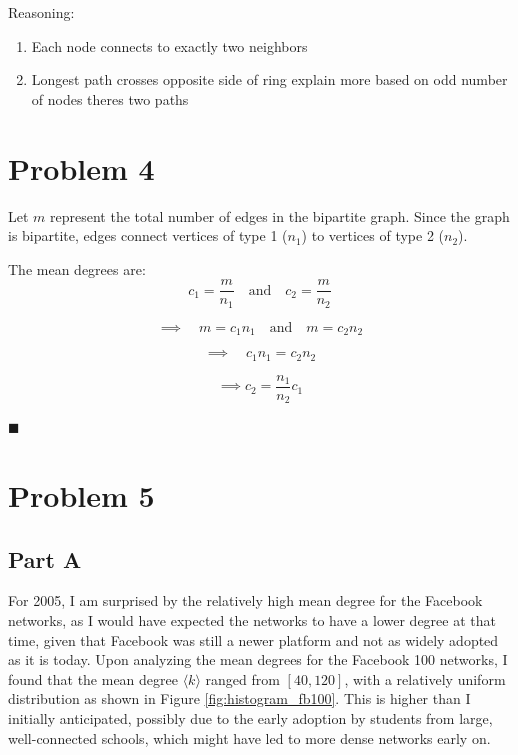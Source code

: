 \documentclass[12pt]{article}
\begin{document}
\noindent Reasoning:
\begin{enumerate}
    \item Each node connects to exactly two neighbors
    \item Longest path crosses opposite side of ring
    explain more based on odd number of nodes theres two paths
\end{enumerate}

\section*{Problem 4}

Let \(m\) represent the total number of edges in the bipartite graph. Since the graph is bipartite, edges connect vertices of type 1 (\(n_1\)) to vertices of type 2 (\(n_2\)).

\noindent The mean degrees are:
\[
c_1 = \frac{m}{n_1} \quad \text{and} \quad c_2 = \frac{m}{n_2}
\]

\[
    \implies \quad m = c_1 n_1 \quad \text{and} \quad m = c_2 n_2
\]


\[
    \implies \quad c_1 n_1 = c_2 n_2
\]

\[
    \implies c_2 = \frac{n_1}{n_2} c_1 
\]

\begin{flushright}
    \(\blacksquare\)
\end{flushright}


\section*{Problem 5}
\subsection*{Part A}

For 2005, I am surprised by the relatively high mean degree for the Facebook networks, as I would have expected the networks to have a lower degree at that time, given that Facebook was still a newer platform and not as widely adopted as it is today. Upon analyzing the mean degrees for the Facebook 100 networks, I found that the mean degree $\langle k \rangle $ ranged from $[40, 120]$, with a relatively uniform distribution as shown in Figure \ref{fig:histogram_fb100}. This is higher than I initially anticipated, possibly due to the early adoption by students from large, well-connected schools, which might have led to more dense networks early on.
\end{document}

